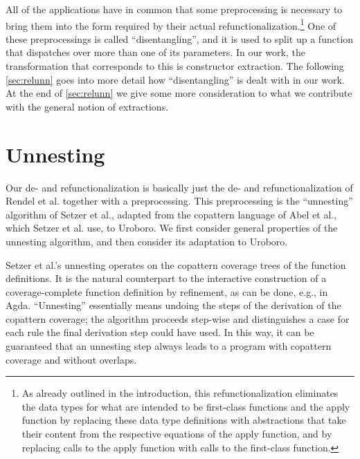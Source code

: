 All of the applications have in common that some preprocessing is necessary to bring them into the form required by their actual refunctionalization.\footnote{As already outlined in the introduction, this refunctionalization eliminates the data types for what are intended to be first-class functions and the apply function by replacing these data type definitions with abstractions that take their content from the respective equations of the apply function, and by replacing calls to the apply function with calls to the first-class function.} One of these preprocessings is called ``disentangling'', and it is used to split up a function that dispatches over more than one of its parameters. In our work, the transformation that corresponds to this is constructor extraction. The following \autoref{sec:relunn} goes into more detail how ``disentangling'' is dealt with in our work. At the end of \autoref{sec:relunn} we give some more consideration to what we contribute with the general notion of extractions.

\section{Unnesting}
\label{sec:relunn}

Our de- and refunctionalization is basically just the de- and refunctionalization of Rendel et al.\cite{rendel15automatic} together with a preprocessing. This preprocessing is the ``unnesting'' algorithm of Setzer et al.\cite{setzer14unnesting}, adapted from the copattern language of Abel et al.\cite{abel13copatterns}, which Setzer et al. use, to Uroboro. We first consider general properties of the unnesting algorithm, and then consider its adaptation to Uroboro.

Setzer et al.'s\cite{setzer14unnesting} unnesting operates on the copattern coverage trees of the function definitions. It is the natural counterpart to the interactive construction of a coverage-complete function definition by refinement, as can be done, e.g., in Agda. ``Unnesting'' essentially means undoing the steps of the derivation of the copattern coverage; the algorithm proceeds step-wise and distinguishes a case for each rule the final derivation step could have used. In this way, it can be guaranteed that an unnesting step always leads to a program with copattern coverage and without overlaps.

